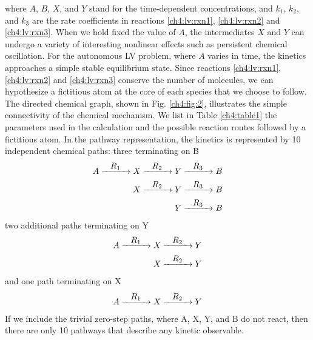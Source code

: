 where $A$, $B$, $X$, and $Y$ stand for the time-dependent
concentrations, and $k_1$, $k_2$, and $k_3$ are the rate coefficients in
reactions \ref{ch4:lv:rxn1}, \ref{ch4:lv:rxn2} and \ref{ch4:lv:rxn3}. When we hold fixed the value of $A$, the
intermediates $X$ and $Y$ can undergo a variety of interesting
nonlinear effects such as persistent chemical oscillation. For the
autonomous LV problem, where $A$ varies in time, the kinetics
approaches a simple stable equilibrium state. Since reactions
\ref{ch4:lv:rxn1}, \ref{ch4:lv:rxn2} and \ref{ch4:lv:rxn3} conserve the number of molecules, we can hypothesize
a fictitious atom at the core of each species that we choose to
follow. The directed chemical graph, shown in Fig. \ref{ch4:fig:2}, illustrates the simple connectivity of the chemical mechanism.
We list in Table \ref{ch4:table1} the parameters used in the calculation and
the possible reaction routes followed by a fictitious atom. In the
pathway representation, the kinetics is represented by 10
independent chemical paths: three terminating on B
\begin{align*}
    A \xrightarrow[]{\makebox[1cm]{$R_1$}} X \xrightarrow[]{\makebox[1cm]{$R_2$}} Y \xrightarrow[]{\makebox[1cm]{$R_3$}} B			\\
    X \xrightarrow[]{\makebox[1cm]{$R_2$}} Y \xrightarrow[]{\makebox[1cm]{$R_3$}} B	\\
	Y \xrightarrow[]{\makebox[1cm]{$R_3$}} B			
\end{align*}
two additional paths terminating on Y
\begin{align*}
    A \xrightarrow[]{\makebox[1cm]{$R_1$}} X \xrightarrow[]{\makebox[1cm]{$R_2$}} Y\\
    X \xrightarrow[]{\makebox[1cm]{$R_2$}} Y\\		
\end{align*}
and one path terminating on X
\begin{align*}
    A \xrightarrow[]{\makebox[1cm]{$R_1$}} X \xrightarrow[]{\makebox[1cm]{$R_2$}} Y			
\end{align*}
If we include the trivial zero-step paths, where A, X, Y, and B do
not react, then there are only 10 pathways that describe any
kinetic observable.
\newline
